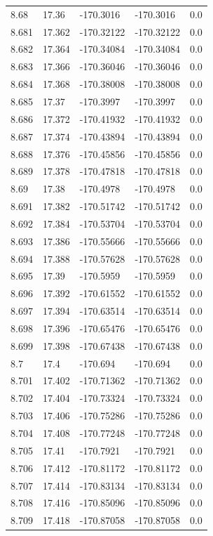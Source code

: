 \begin{tabular}{lllll}
8.68 & 17.36 & -170.3016 & -170.3016 & 0.0 \\
8.681 & 17.362 & -170.32122 & -170.32122 & 0.0 \\
8.682 & 17.364 & -170.34084 & -170.34084 & 0.0 \\
8.683 & 17.366 & -170.36046 & -170.36046 & 0.0 \\
8.684 & 17.368 & -170.38008 & -170.38008 & 0.0 \\
8.685 & 17.37 & -170.3997 & -170.3997 & 0.0 \\
8.686 & 17.372 & -170.41932 & -170.41932 & 0.0 \\
8.687 & 17.374 & -170.43894 & -170.43894 & 0.0 \\
8.688 & 17.376 & -170.45856 & -170.45856 & 0.0 \\
8.689 & 17.378 & -170.47818 & -170.47818 & 0.0 \\
8.69 & 17.38 & -170.4978 & -170.4978 & 0.0 \\
8.691 & 17.382 & -170.51742 & -170.51742 & 0.0 \\
8.692 & 17.384 & -170.53704 & -170.53704 & 0.0 \\
8.693 & 17.386 & -170.55666 & -170.55666 & 0.0 \\
8.694 & 17.388 & -170.57628 & -170.57628 & 0.0 \\
8.695 & 17.39 & -170.5959 & -170.5959 & 0.0 \\
8.696 & 17.392 & -170.61552 & -170.61552 & 0.0 \\
8.697 & 17.394 & -170.63514 & -170.63514 & 0.0 \\
8.698 & 17.396 & -170.65476 & -170.65476 & 0.0 \\
8.699 & 17.398 & -170.67438 & -170.67438 & 0.0 \\
8.7 & 17.4 & -170.694 & -170.694 & 0.0 \\
8.701 & 17.402 & -170.71362 & -170.71362 & 0.0 \\
8.702 & 17.404 & -170.73324 & -170.73324 & 0.0 \\
8.703 & 17.406 & -170.75286 & -170.75286 & 0.0 \\
8.704 & 17.408 & -170.77248 & -170.77248 & 0.0 \\
8.705 & 17.41 & -170.7921 & -170.7921 & 0.0 \\
8.706 & 17.412 & -170.81172 & -170.81172 & 0.0 \\
8.707 & 17.414 & -170.83134 & -170.83134 & 0.0 \\
8.708 & 17.416 & -170.85096 & -170.85096 & 0.0 \\
8.709 & 17.418 & -170.87058 & -170.87058 & 0.0 \\

\end{tabular}

